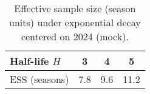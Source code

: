 \begin{table}[t]
  \centering
  \small
  \caption{Effective sample size (season units) under exponential decay centered on 2024 (mock).}
  \begin{tabular}{lccc}
    \toprule
    Half-life $H$ & 3 & 4 & 5 \\
    \midrule
    ESS (seasons) & 7.8 & 9.6 & 11.2 \\
    \bottomrule
  \end{tabular}
\end{table}
